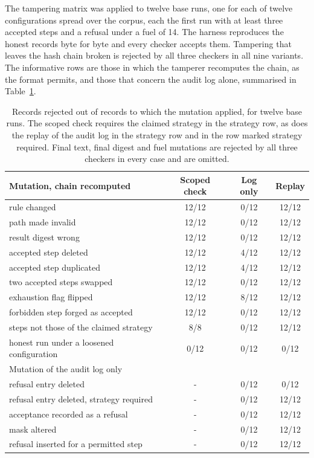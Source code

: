 \documentclass[11pt]{article}
\theoremstyle{definition}
\theoremstyle{remark}
\begin{document}
The tampering matrix was applied to twelve base runs, one for each of twelve configurations spread over the corpus, each the first run with at least three accepted steps and a refusal under a fuel of 14. The harness reproduces the honest records byte for byte and every checker accepts them. Tampering that leaves the hash chain broken is rejected by all three checkers in all nine variants. The informative rows are those in which the tamperer recomputes the chain, as the format permits, and those that concern the audit log alone, summarised in Table~\ref{tab:mutation}.

\begin{table}[ht]
\centering
\small
\begin{tabular}{lccc}
\hline
Mutation, chain recomputed & Scoped check & Log only & Replay \\
\hline
rule changed & 12/12 & 0/12 & 12/12 \\
path made invalid & 12/12 & 0/12 & 12/12 \\
result digest wrong & 12/12 & 0/12 & 12/12 \\
accepted step deleted & 12/12 & 4/12 & 12/12 \\
accepted step duplicated & 12/12 & 4/12 & 12/12 \\
two accepted steps swapped & 12/12 & 0/12 & 12/12 \\
exhaustion flag flipped & 12/12 & 8/12 & 12/12 \\
forbidden step forged as accepted & 12/12 & 0/12 & 12/12 \\
steps not those of the claimed strategy & 8/8 & 0/12 & 12/12 \\
honest run under a loosened configuration & 0/12 & 0/12 & 0/12 \\
\hline
Mutation of the audit log only & & & \\
\hline
refusal entry deleted & - & 0/12 & 0/12 \\
refusal entry deleted, strategy required & - & 0/12 & 12/12 \\
acceptance recorded as a refusal & - & 0/12 & 12/12 \\
mask altered & - & 0/12 & 12/12 \\
refusal inserted for a permitted step & - & 0/12 & 12/12 \\
\hline
\end{tabular}
\caption{Records rejected out of records to which the mutation applied, for twelve base runs. The scoped check requires the claimed strategy in the strategy row, as does the replay of the audit log in the strategy row and in the row marked strategy required. Final text, final digest and fuel mutations are rejected by all three checkers in every case and are omitted.}\label{tab:mutation}
\end{table}
\end{document}
